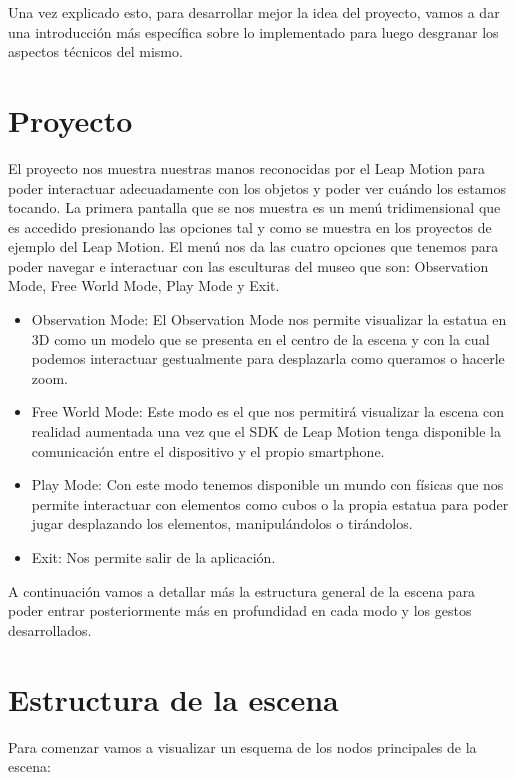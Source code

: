 \documentclass[a4paper,11pt]{article}
\begin{document}
\vspace{10px}

Una vez explicado esto, para desarrollar mejor la idea del proyecto, vamos a dar una introducción más específica sobre lo implementado para luego desgranar los aspectos técnicos del mismo.

\section{Proyecto}

El proyecto nos muestra nuestras manos reconocidas por el Leap Motion para poder interactuar adecuadamente con los objetos y poder ver cuándo los estamos tocando. La primera pantalla que se nos muestra es un menú tridimensional que es accedido presionando las opciones tal y como se muestra en los proyectos de ejemplo del Leap Motion. El menú nos da las cuatro opciones que tenemos para poder navegar e interactuar con las esculturas del museo que son: Observation Mode, Free World Mode, Play Mode y Exit.
\begin{itemize}
	\item Observation Mode: El Observation Mode nos permite visualizar la estatua en 3D como un modelo que se presenta en el centro de la escena y con la cual podemos interactuar gestualmente para desplazarla como queramos o hacerle zoom.
	\item Free World Mode: Este modo es el que nos permitirá visualizar la escena con realidad aumentada una vez que el SDK de Leap Motion tenga disponible la comunicación entre el dispositivo y el propio smartphone.
	\item Play Mode: Con este modo tenemos disponible un mundo con físicas que nos permite interactuar con elementos como cubos o la propia estatua para poder jugar desplazando los elementos, manipulándolos o tirándolos.
	\item Exit: Nos permite salir de la aplicación.
\end{itemize}

A continuación vamos a detallar más la estructura general de la escena para poder entrar posteriormente más en profundidad en cada modo y los gestos desarrollados.

\section{Estructura de la escena}

Para comenzar vamos a visualizar un esquema de los nodos principales de la escena:
\end{document}
